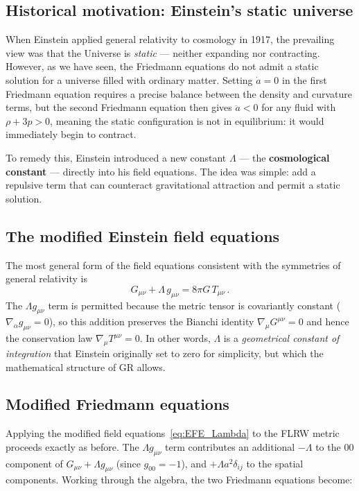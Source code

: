 \subsection*{Historical motivation: Einstein's static universe}

When Einstein applied general relativity to cosmology in 1917, the prevailing view was that the Universe is \emph{static} --- neither expanding nor contracting. However, as we have seen, the Friedmann equations do not admit a static solution for a universe filled with ordinary matter. Setting $\dot{a}=0$ in the first Friedmann equation requires a precise balance between the density and curvature terms, but the second Friedmann equation then gives $\ddot{a}<0$ for any fluid with $\rho+3p>0$, meaning the static configuration is not in equilibrium: it would immediately begin to contract.

To remedy this, Einstein introduced a new constant $\Lambda$ --- the \textbf{cosmological constant} --- directly into his field equations. The idea was simple: add a repulsive term that can counteract gravitational attraction and permit a static solution.

\subsection*{The modified Einstein field equations}

The most general form of the field equations consistent with the symmetries of general relativity is
\begin{equation}
\label{eq:EFE_Lambda}
    G_{\mu\nu} + \Lambda\, g_{\mu\nu} = 8\pi G\, T_{\mu\nu}\,.
\end{equation}
The $\Lambda g_{\mu\nu}$ term is permitted because the metric tensor is covariantly constant ($\nabla_\alpha g_{\mu\nu}=0$), so this addition preserves the Bianchi identity $\nabla_\mu G^{\mu\nu}=0$ and hence the conservation law $\nabla_\mu T^{\mu\nu}=0$. In other words, $\Lambda$ is a \emph{geometrical constant of integration} that Einstein originally set to zero for simplicity, but which the mathematical structure of GR allows.

\subsection*{Modified Friedmann equations}

Applying the modified field equations~\eqref{eq:EFE_Lambda} to the FLRW metric proceeds exactly as before. The $\Lambda g_{\mu\nu}$ term contributes an additional $-\Lambda$ to the $00$ component of $G_{\mu\nu}+\Lambda g_{\mu\nu}$ (since $g_{00}=-1$), and $+\Lambda a^2\delta_{ij}$ to the spatial components. Working through the algebra, the two Friedmann equations become:

